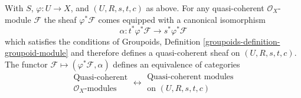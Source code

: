 \begin{proposition}
\label{proposition-quasi-coherent}
With $S$, $\varphi : U \to X$, and $(U, R, s, t, c)$ as above.
For any quasi-coherent $\mathcal{O}_X$-module $\mathcal{F}$ the
sheaf $\varphi^*\mathcal{F}$ comes equipped with a canonical
isomorphism
$$
\alpha : t^*\varphi^*\mathcal{F} \longrightarrow s^*\varphi^*\mathcal{F}
$$
which satisfies the conditions of 
Groupoids, Definition \ref{groupoids-definition-groupoid-module}
and therefore defines a quasi-coherent sheaf on $(U, R, s, t, c)$.
The functor $\mathcal{F} \mapsto (\varphi^*\mathcal{F}, \alpha)$
defines an equivalence of categories
$$
\begin{matrix}
\text{Quasi-coherent} \\
\mathcal{O}_X\text{-modules}
\end{matrix}
\longleftrightarrow
\begin{matrix}
\text{Quasi-coherent modules}\\
\text{on }(U, R, s, t, c)
\end{matrix}
$$
\end{proposition}

